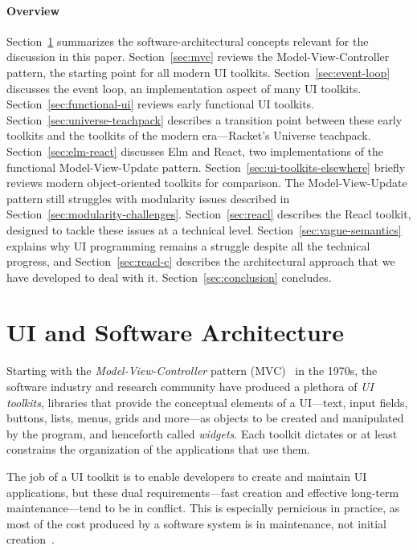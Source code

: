 \documentclass[sigplan,screen]{acmart}
\begin{document}
\paragraph{Overview} Section~\ref{sec:ui-and-architecture} summarizes
the software-architectural concepts relevant for the discussion in
this paper.  Section~\ref{sec:mvc} reviews the Model-View-Controller
pattern, the starting point for all modern UI toolkits.
Section~\ref{sec:event-loop} discusses the event loop, an
implementation aspect of many UI toolkits.  Section~\ref{sec:functional-ui} reviews
early functional UI toolkits.  Section~\ref{sec:universe-teachpack}
describes a transition point between these early toolkits and the
toolkits of the modern era---Racket's Universe teachpack.
Section~\ref{sec:elm-react} discusses Elm and React, two
implementations of the functional Model-View-Update pattern.
Section~\ref{sec:ui-toolkits-elsewhere} briefly reviews modern
object-oriented toolkits for comparison.  The Model-View-Update
pattern still struggles with modularity issues described in
Section~\ref{sec:modularity-challenges}.  Section~\ref{sec:reacl}
describes the Reacl toolkit, designed to tackle these issues at a
technical level.  Section~\ref{sec:vague-semantics} explains why UI
programming remains a struggle despite all the technical progress, and
Section~\ref{sec:reacl-c} describes the architectural approach that we
have developed to deal with it.  Section~\ref{sec:conclusion} concludes.


\section{UI and Software Architecture}
\label{sec:ui-and-architecture}

Starting with the \textit{Model-View-Controller} pattern
(MVC)~\cite{MVC} in the 1970s, the software
industry and research community have produced a plethora of \textit{UI
  toolkits}, libraries that provide the conceptual elements of a
UI---text, input fields, buttons, lists, menus, grids and more---as
objects to be created and manipulated by the program, and henceforth
called \textit{widgets}.  Each toolkit dictates or at least
constrains the organization of the applications that use them.

The job of a UI toolkit is to enable developers to create and maintain
UI applications, but these dual requirements---fast creation and
effective long-term maintenance---tend to be in conflict.  This is especially pernicious in
practice, as most of the cost produced by a software system is in
maintenance, not initial creation~\cite{GreenBook}.
\end{document}
